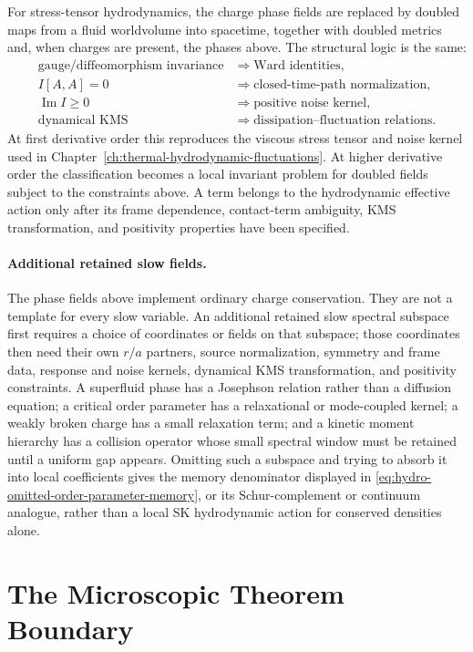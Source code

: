 For stress-tensor hydrodynamics, the charge phase fields are replaced by
doubled maps from a fluid worldvolume into spacetime, together with doubled
metrics and, when charges are present, the phases above.  The structural
logic is the same:
\[
\begin{aligned}
  \text{gauge/diffeomorphism invariance}
  &\Longrightarrow
  \text{Ward identities},\\[2mm]
  I[A,A]=0
  &\Longrightarrow
  \text{closed-time-path normalization},\\[2mm]
  \operatorname{Im}I\ge0
  &\Longrightarrow
  \text{positive noise kernel},\\[2mm]
  \text{dynamical KMS}
  &\Longrightarrow
  \text{dissipation--fluctuation relations}.
\end{aligned}
\]
At first derivative order this reproduces the viscous stress tensor and
noise kernel used in Chapter~\ref{ch:thermal-hydrodynamic-fluctuations}.
At higher derivative order the classification becomes a local invariant
problem for doubled fields subject to the constraints above.  A term belongs
to the hydrodynamic effective action only after its frame dependence,
contact-term ambiguity, KMS transformation, and positivity properties have
been specified.

\paragraph{Additional retained slow fields.}
The phase fields above implement ordinary charge conservation.  They are not a
template for every slow variable.  An additional retained slow spectral
subspace first requires a choice of coordinates or fields on that subspace;
those coordinates then need their own \(r/a\) partners, source normalization,
symmetry and frame data, response and noise kernels, dynamical KMS
transformation, and positivity constraints.  A superfluid phase has a
Josephson relation rather than a diffusion equation; a critical order
parameter has a relaxational or mode-coupled kernel; a weakly broken charge has
a small relaxation term; and a kinetic moment hierarchy has a collision
operator whose small spectral window must be retained until a uniform gap
appears.  Omitting such a subspace and trying to absorb it into local
coefficients gives the memory denominator displayed in
\eqref{eq:hydro-omitted-order-parameter-memory}, or its Schur-complement or
continuum analogue, rather than a local SK hydrodynamic action for conserved
densities alone.

\section{The Microscopic Theorem Boundary}

